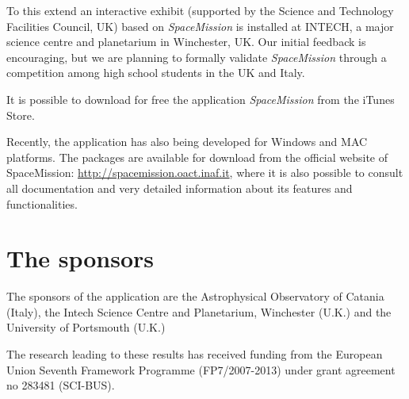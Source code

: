 To this extend an interactive exhibit (supported by the Science and Technology Facilities Council, UK) based on \emph{SpaceMission} is installed at INTECH, a major science centre and planetarium in Winchester, UK. Our initial feedback is encouraging, but we are planning to formally validate \emph{SpaceMission} through a competition among high school students in the UK and Italy.

It is possible to download for free the application \emph{SpaceMission} from the iTunes Store.

Recently, the application has also being developed for Windows and MAC platforms. The packages are available for download from the official website of SpaceMission: \url{http://spacemission.oact.inaf.it}, where it is also possible to consult  all documentation and very detailed information about its features and functionalities.

\section{The sponsors}
The sponsors of the application are the Astrophysical Observatory of Catania (Italy), the Intech Science Centre and Planetarium, Winchester  (U.K.) and the University of Portsmouth (U.K.)

\acknowledgements The research leading to these results has received funding from the European Union Seventh Framework Programme (FP7/2007-2013) under grant agreement no 283481 (SCI-BUS).
